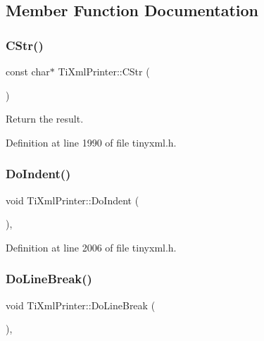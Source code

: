 \subsection{Member Function Documentation}
\hypertarget{class_ti_xml_printer_a859eede9597d3e0355b77757be48735e}{}\label{class_ti_xml_printer_a859eede9597d3e0355b77757be48735e} 
\subsubsection{\texorpdfstring{C\+Str()}{CStr()}}
{\footnotesize\ttfamily const char$\ast$ Ti\+Xml\+Printer\+::\+C\+Str (\begin{DoxyParamCaption}{ }\end{DoxyParamCaption})\hspace{0.3cm}{\ttfamily [inline]}}



Return the result. 



Definition at line 1990 of file tinyxml.\+h.

\hypertarget{class_ti_xml_printer_a348ad6527b1d43ddeb51454cddeb6a1d}{}\label{class_ti_xml_printer_a348ad6527b1d43ddeb51454cddeb6a1d} 
\subsubsection{\texorpdfstring{Do\+Indent()}{DoIndent()}}
{\footnotesize\ttfamily void Ti\+Xml\+Printer\+::\+Do\+Indent (\begin{DoxyParamCaption}{ }\end{DoxyParamCaption})\hspace{0.3cm}{\ttfamily [inline]}, {\ttfamily [private]}}



Definition at line 2006 of file tinyxml.\+h.

\hypertarget{class_ti_xml_printer_a252a0e13e06def9a06b2eb30a04677a0}{}\label{class_ti_xml_printer_a252a0e13e06def9a06b2eb30a04677a0} 
\subsubsection{\texorpdfstring{Do\+Line\+Break()}{DoLineBreak()}}
{\footnotesize\ttfamily void Ti\+Xml\+Printer\+::\+Do\+Line\+Break (\begin{DoxyParamCaption}{ }\end{DoxyParamCaption})\hspace{0.3cm}{\ttfamily [inline]}, {\ttfamily [private]}}



